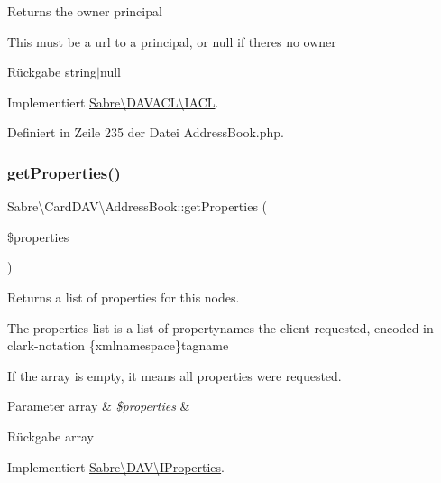 Returns the owner principal

This must be a url to a principal, or null if there\textquotesingle{}s no owner

\begin{DoxyReturn}{Rückgabe}
string$\vert$null 
\end{DoxyReturn}


Implementiert \mbox{\hyperlink{interface_sabre_1_1_d_a_v_a_c_l_1_1_i_a_c_l_a05f531b4ae1a86eab4e6e95b0413390e}{Sabre\textbackslash{}\+D\+A\+V\+A\+C\+L\textbackslash{}\+I\+A\+CL}}.



Definiert in Zeile 235 der Datei Address\+Book.\+php.

\mbox{\label{class_sabre_1_1_card_d_a_v_1_1_address_book_aea76f0a02701bda8632ec7bdfb0f3681}} 
\subsubsection{\texorpdfstring{get\+Properties()}{getProperties()}}
{\footnotesize\ttfamily Sabre\textbackslash{}\+Card\+D\+A\+V\textbackslash{}\+Address\+Book\+::get\+Properties (\begin{DoxyParamCaption}\item[{}]{\$properties }\end{DoxyParamCaption})}

Returns a list of properties for this nodes.

The properties list is a list of propertynames the client requested, encoded in clark-\/notation \{xmlnamespace\}tagname

If the array is empty, it means \textquotesingle{}all properties\textquotesingle{} were requested.


\begin{DoxyParams}[1]{Parameter}
array & {\em \$properties} & \\
\hline
\end{DoxyParams}
\begin{DoxyReturn}{Rückgabe}
array 
\end{DoxyReturn}


Implementiert \mbox{\hyperlink{interface_sabre_1_1_d_a_v_1_1_i_properties_a0d2fcaacf74daaa5cf24ea53a057140a}{Sabre\textbackslash{}\+D\+A\+V\textbackslash{}\+I\+Properties}}.



